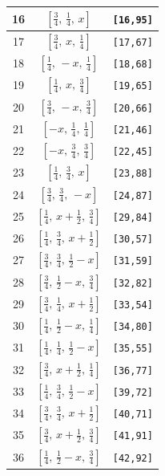 \documentclass[fleqn,8pt]{jsarticle}
\begin{document}
\begin{longtable}{ccc}
16 & $\left[ \frac{3}{4},\, \frac{1}{4},\, x \right]$ & {\tt [16,95]} \\ \hline
17 & $\left[ \frac{3}{4},\, x,\, \frac{1}{4} \right]$ & {\tt [17,67]} \\ \hline
18 & $\left[ \frac{1}{4},\, - x,\, \frac{1}{4} \right]$ & {\tt [18,68]} \\ \hline
19 & $\left[ \frac{1}{4},\, x,\, \frac{3}{4} \right]$ & {\tt [19,65]} \\ \hline
20 & $\left[ \frac{3}{4},\, - x,\, \frac{3}{4} \right]$ & {\tt [20,66]} \\ \hline
21 & $\left[ - x,\, \frac{1}{4},\, \frac{1}{4} \right]$ & {\tt [21,46]} \\ \hline
22 & $\left[ - x,\, \frac{3}{4},\, \frac{3}{4} \right]$ & {\tt [22,45]} \\ \hline
23 & $\left[ \frac{1}{4},\, \frac{3}{4},\, x \right]$ & {\tt [23,88]} \\ \hline
24 & $\left[ \frac{3}{4},\, \frac{3}{4},\, - x \right]$ & {\tt [24,87]} \\ \hline
25 & $\left[ \frac{1}{4},\, x + \frac{1}{2},\, \frac{3}{4} \right]$ & {\tt [29,84]} \\ \hline
26 & $\left[ \frac{1}{4},\, \frac{3}{4},\, x + \frac{1}{2} \right]$ & {\tt [30,57]} \\ \hline
27 & $\left[ \frac{3}{4},\, \frac{3}{4},\, \frac{1}{2} - x \right]$ & {\tt [31,59]} \\ \hline
28 & $\left[ \frac{3}{4},\, \frac{1}{2} - x,\, \frac{3}{4} \right]$ & {\tt [32,82]} \\ \hline
29 & $\left[ \frac{3}{4},\, \frac{1}{4},\, x + \frac{1}{2} \right]$ & {\tt [33,54]} \\ \hline
30 & $\left[ \frac{1}{4},\, \frac{1}{2} - x,\, \frac{1}{4} \right]$ & {\tt [34,80]} \\ \hline
31 & $\left[ \frac{1}{4},\, \frac{1}{4},\, \frac{1}{2} - x \right]$ & {\tt [35,55]} \\ \hline
32 & $\left[ \frac{3}{4},\, x + \frac{1}{2},\, \frac{1}{4} \right]$ & {\tt [36,77]} \\ \hline
33 & $\left[ \frac{1}{4},\, \frac{3}{4},\, \frac{1}{2} - x \right]$ & {\tt [39,72]} \\ \hline
34 & $\left[ \frac{3}{4},\, \frac{3}{4},\, x + \frac{1}{2} \right]$ & {\tt [40,71]} \\ \hline
35 & $\left[ \frac{3}{4},\, x + \frac{1}{2},\, \frac{3}{4} \right]$ & {\tt [41,91]} \\ \hline
36 & $\left[ \frac{1}{4},\, \frac{1}{2} - x,\, \frac{3}{4} \right]$ & {\tt [42,92]} \\ \hline

\end{longtable}
\end{document}

